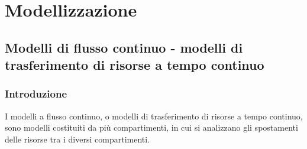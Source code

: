 \section{Modellizzazione}
\subsection{Modelli di flusso continuo - modelli di trasferimento di risorse a tempo continuo}
\subsubsection*{Introduzione}
I modelli a flusso continuo, o modelli di trasferimento di risorse a tempo continuo, sono modelli costituiti da più compartimenti,
in cui si analizzano gli spostamenti delle risorse tra i diversi compartimenti.

